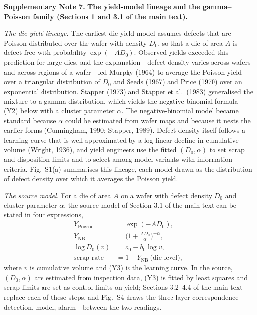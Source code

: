 \clearpage
\textbf{Supplementary Note 7. The yield-model lineage and the gamma–Poisson family (Sections 1 and 3.1 of the main text).}

\textit{The die-yield lineage.} The earliest die-yield model assumes defects that are Poisson-distributed over the wafer with density $D_{0}$, so that a die of area $A$ is defect-free with probability $\exp(-AD_{0})$. Observed yields exceeded this prediction for large dies, and the explanation---defect density varies across wafers and across regions of a wafer---led Murphy (1964) to average the Poisson yield over a triangular distribution of $D_{0}$ and Seeds (1967) and Price (1970) over an exponential distribution. Stapper (1973) and Stapper et al.\ (1983) generalised the mixture to a gamma distribution, which yields the negative-binomial formula (Y2) below with a cluster parameter $\alpha$. The negative-binomial model became standard because $\alpha$ could be estimated from wafer maps and because it nests the earlier forms (Cunningham, 1990; Stapper, 1989). Defect density itself follows a learning curve that is well approximated by a log-linear decline in cumulative volume (Wright, 1936), and yield engineers use the fitted $(D_{0},\alpha)$ to set scrap and disposition limits and to select among model variants with information criteria. Fig.~S1(a) summarises this lineage, each model drawn as the distribution of defect density over which it averages the Poisson yield.

\textit{The source model.} For a die of area $A$ on a wafer with defect density $D_{0}$ and cluster parameter $\alpha$, the source model of Section 3.1 of the main text can be stated in four expressions,
\begin{align}
Y_{\mathrm{Poisson}} &= \exp(-AD_{0}), \tag{Y1}\\
Y_{\mathrm{NB}} &= \Big(1 + \frac{AD_{0}}{\alpha}\Big)^{-\alpha}, \tag{Y2}\\
\log D_{0}(v) &= a_{0} - b_{0}\log v, \tag{Y3}\\
\text{scrap rate} &= 1 - Y_{\mathrm{NB}}\ \text{(die level)}, \tag{Y4}
\end{align}
where $v$ is cumulative volume and (Y3) is the learning curve. In the source, $(D_{0},\alpha)$ are estimated from inspection data, (Y3) is fitted by least squares and scrap limits are set as control limits on yield; Sections 3.2--4.4 of the main text replace each of these steps, and Fig.~S4 draws the three-layer correspondence---detection, model, alarm---between the two readings.

